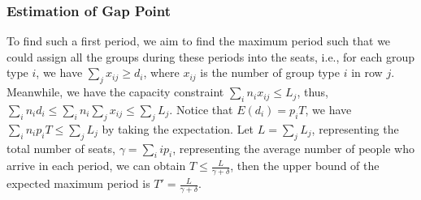 \subsubsection{Estimation of Gap Point}





To find such a first period, we aim to find the maximum period such that we could assign all the groups during these periods into the seats, i.e., for each group type $i$, we have $\sum_{j} x_{ij} \geq d_i$, where $x_{ij}$ is the number of group type $i$ in row $j$. Meanwhile, we have the capacity constraint $\sum_{i} n_{i} x_{ij} \leq L_j$, thus, $\sum_{i} n_i d_i \leq \sum_{i} n_i \sum_{j} x_{ij} \leq \sum_{j} L_{j}$. Notice that $E(d_i) = p_i T$, we have $\sum_{i} n_i p_i T \leq \sum_{j} L_{j}$ by taking the expectation. Let $L = \sum_{j} L_{j}$, representing the total number of seats, $\gamma = \sum_{i} i p_i$, representing the average number of people who arrive in each period, we can obtain $T \leq \frac{L}{\gamma + \delta}$, then the upper bound of the expected maximum period is $T' = \frac{L}{\gamma + \delta}$.


